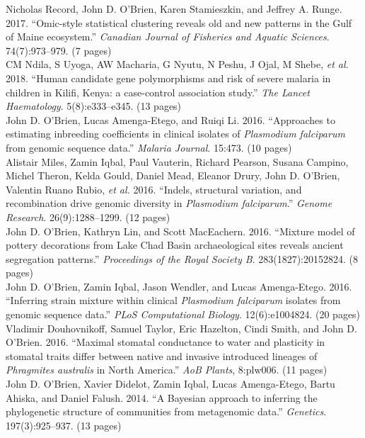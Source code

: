 \documentclass[10pt]{article}
\begin{document}
Nicholas Record, John D. O'Brien, Karen Stamieszkin, and Jeffrey A. Runge.  2017. ``Omic-style statistical clustering reveals old and new patterns in the Gulf of Maine ecosystem.''  \emph{Canadian Journal of Fisheries and Aquatic Sciences}. 74(7):973--979. (7 pages) \\

CM Ndila,  S Uyoga,  AW Macharia,  G Nyutu, N  Peshu,  J Ojal,  M Shebe,  \emph{et al.} 2018. ``Human candidate gene polymorphisms and risk of severe malaria in children in Kilifi, Kenya: a case-control association study.'' \emph{The Lancet Haematology}. 
5(8):e333--e345. (13 pages)\\

John D. O'Brien, Lucas Amenga-Etego, and Ruiqi Li. 2016. ``Approaches to estimating inbreeding coefficients in clinical isolates of \emph{Plasmodium falciparum} from genomic sequence data.'' \emph{Malaria Journal}. 15:473. (10 pages) \\

Alistair Miles, Zamin Iqbal, Paul Vauterin, Richard Pearson, Susana Campino, Michel Theron, Kelda Gould, Daniel Mead, Eleanor Drury, John D. O'Brien, Valentin Ruano Rubio, \emph{et al.} 2016. ``Indels, structural variation, and recombination drive genomic diversity in \emph{Plasmodium falciparum}.'' \emph{Genome Research}. 26(9):1288--1299. (12 pages) \\

John D. O'Brien, Kathryn Lin, and Scott MacEachern. 2016. ``Mixture model of pottery decorations from Lake Chad Basin archaeological sites reveals ancient segregation patterns.'' \emph{Proceedings of the Royal Society B}. 283(1827):20152824. (8 pages)\\

John D. O'Brien, Zamin Iqbal, Jason Wendler, and Lucas Amenga-Etego. 2016. ``Inferring strain mixture within clinical \emph{Plasmodium falciparum} isolates from genomic sequence data.'' \emph{PLoS Computational Biology}. 12(6):e1004824.  (20 pages)\\

Vladimir Douhovnikoff, Samuel Taylor, Eric Hazelton, Cindi Smith, and John D. O'Brien. 2016. ``Maximal stomatal conductance to water and plasticity in stomatal traits differ between native and invasive introduced lineages of \emph{Phragmites australis} in North America.'' \emph{AoB Plants}, 8:plw006.  (11 pages) \\

John D. O'Brien, Xavier Didelot, Zamin Iqbal, Lucas Amenga-Etego, Bartu Ahiska, and Daniel Falush. 2014. ``A Bayesian approach to inferring the phylogenetic structure of communities from metagenomic data.'' \emph{Genetics}. 197(3):925--937. (13 pages) \\
\end{document}
